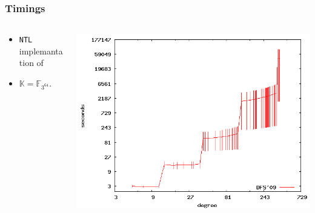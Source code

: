 \documentclass[10pt]{beamer}
\newcommand{\K}{\mathbb{K}}  %
\newcommand{\F}{\mathbb{F}}  %
\newcommand{\0}{\mathcal{O}}  %
\begin{document}
\begin{frame}
  \frametitle{Timings}

  
  \begin{columns}
    \begin{column}{0.4\textwidth}
      \begin{itemize}
      \item \texttt{NTL} implemantation of \cite{DFS09}
      \item $\K = \F_{3^{64}}$.
      \end{itemize}
    \end{column}
    \begin{column}{0.6\textwidth}
             {\includegraphics[width=\textwidth]{3-64}}


\end{column}
\end{columns}
\end{frame}
\end{document}
